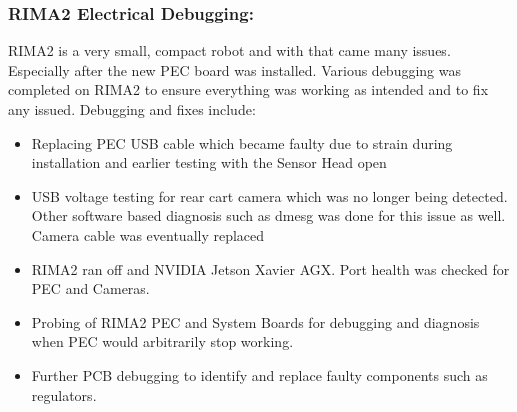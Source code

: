 
\subsubsection{RIMA2 Electrical Debugging:}

RIMA2 is a very small, compact robot and with that came many issues. Especially after the new PEC board was installed. Various debugging was completed on RIMA2 to ensure everything was working as intended and to fix any issued.
Debugging and fixes include:

\begin{itemize}
    \item Replacing PEC USB cable which became faulty due to strain during installation and earlier testing with the Sensor Head open
    \item USB voltage testing for rear cart camera which was no longer being detected. Other software based diagnosis such as dmesg was done for this issue as well. Camera cable was eventually replaced
    \item RIMA2 ran off and NVIDIA Jetson Xavier AGX. Port health was checked for PEC and Cameras.
    \item Probing of RIMA2 PEC and System Boards for debugging and diagnosis when PEC would arbitrarily stop working.
    \item Further PCB debugging to identify and replace faulty components such as regulators.
\end{itemize}